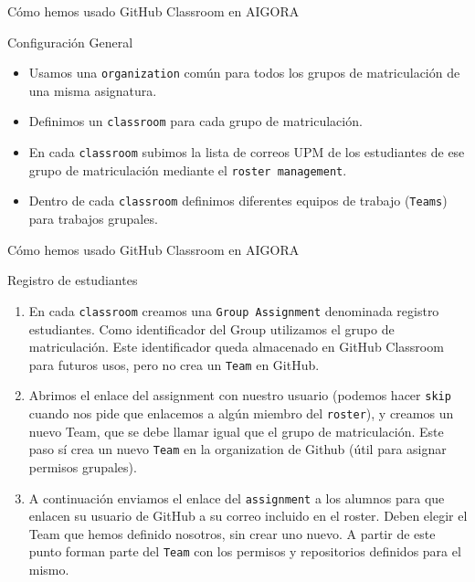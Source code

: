\documentclass[xcolor={usenames,svgnames,dvipsnames}]{beamer}
\begin{document}
\begin{frame}[label={sec:orgf5d6e4f},fragile]{Cómo hemos usado GitHub Classroom en AIGORA}
 \begin{block}{Configuración General}
\begin{itemize}
\item Usamos una \texttt{organization} común para todos los grupos de matriculación de una misma asignatura.
\item Definimos un \texttt{classroom} para cada grupo de matriculación.
\item En cada \texttt{classroom} subimos la lista de correos UPM de los estudiantes de ese grupo de matriculación mediante el \texttt{roster management}.
\item Dentro de cada \texttt{classroom} definimos diferentes equipos de trabajo (\texttt{Teams}) para trabajos grupales.
\end{itemize}
\end{block}
\end{frame}
\begin{frame}[label={sec:org12bd483},fragile]{Cómo hemos usado GitHub Classroom en AIGORA}
 \begin{block}{Registro de estudiantes}
\begin{enumerate}
\item En cada \texttt{classroom} creamos una \texttt{Group Assignment} denominada \guillemotleft{}registro estudiantes\guillemotright{}. Como identificador del \guillemotleft{}Group\guillemotright{} utilizamos el grupo de matriculación. Este identificador queda almacenado en GitHub Classroom para futuros usos, pero \alert{no} crea un \texttt{Team} en GitHub.
\item Abrimos el enlace del assignment con nuestro usuario (podemos hacer \texttt{skip} cuando nos pide que enlacemos a algún miembro del \texttt{roster}), y \alert{creamos un nuevo Team}, que se debe llamar igual que el grupo de matriculación. Este paso \alert{sí} crea un nuevo \texttt{Team} en la organization de Github (útil para asignar permisos grupales).
\item A continuación enviamos el enlace del \texttt{assignment} a los alumnos para que enlacen su usuario de GitHub a su correo incluido en el roster.  \alert{Deben elegir el Team que hemos definido nosotros, sin crear uno nuevo}. A partir de este punto forman parte del \texttt{Team} con los permisos y repositorios definidos para el mismo.
\end{enumerate}
\end{block}
\end{frame}
\end{document}
